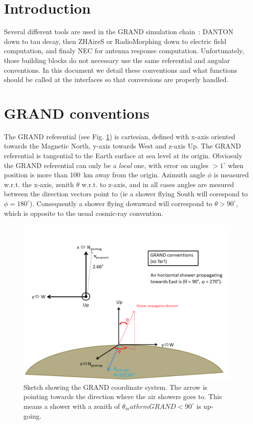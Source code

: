 \documentclass[12pt]{article}
\begin{document}
\section{Introduction}
Several different tools are used in the GRAND simulation chain~: DANTON down to tau decay, then ZHAireS or RadioMorphing down to electric field computation, and finaly NEC for antenna response computation. Unfortunately, those building blocks do not necessary use the same referential and angular conventions. In this document we detail these conventions and what functions should be called at the interfaces so that conversions are properly handled.

\section{GRAND conventions}  \label{sec:grand}
The GRAND referential (see Fig. \ref{fig:grandref}) is cartesian, defined with x-axis oriented towards the Magnetic North, y-axis towards West and z-axis Up. The GRAND referential is tangential to the Earth surface at sea level at its origin. Obviosuly the GRAND referential can only be a {\it local} one,  with error on angles $>1^{\circ}$ when position is more than 100~km away from the origin. Azimuth angle $\phi$ is measured w.r.t. the x-axis, zenith $\theta$ w.r.t. to z-axis, and in all cases angles are mesured between the direction vectors point to (ie a shower flying South will corespond to $\phi=180^{\circ}$). Consequently a shower flying downward will correspond to $\theta>90^{\circ}$, which is opposite to the usual cosmic-ray convention. 
%
\begin{figure}[ht]
\centering
\includegraphics[width=\textwidth]{GRANDreferential.png} 
\caption{\label{fig:grandref} Sketch showing the GRAND coordinate system. The arrow is pointing towards the direction where the air showers goes to. This means a shower with a zenith of $\theta_mathrm{GRAND}<90^\circ$ is up-going.}
\end{figure} 
\end{document}
